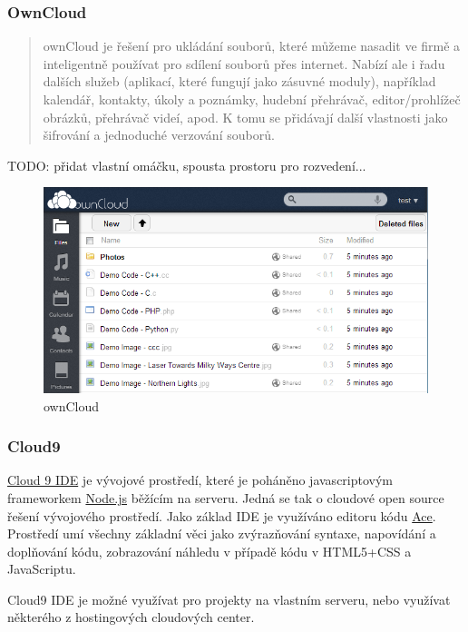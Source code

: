 \subsubsection{OwnCloud}
\begin{quote}ownCloud je řešení pro ukládání souborů, které můžeme nasadit ve firmě a inteligentně používat pro sdílení souborů přes internet. Nabízí ale i řadu dalších služeb (aplikací, které fungují jako zásuvné moduly), například kalendář, kontakty, úkoly a poznámky, hudební přehrávač, editor/prohlížeč obrázků, přehrávač videí, apod. K tomu se přidávají další vlastnosti jako šifrování a jednoduché verzování souborů.\cite{samuraj:ownCLoud5}
\end{quote}
TODO: přidat vlastní omáčku, spousta prostoru pro rozvedení...
\begin{figure}[htbp]
	\centering
		\includegraphics[width=1.00\textwidth]{ext/ownCloud.png}
	\caption{ownCloud}
	\label{fig:ownCloud}
\end{figure}

\subsubsection{Cloud9}
\href{https://github.com/ajaxorg/cloud9}{Cloud 9 IDE} je vývojové prostředí, které je poháněno javascriptovým frameworkem \href{http://nodejs.org/}{Node.js} běžícím na serveru. Jedná se tak o cloudové open source řešení vývojového prostředí. Jako základ IDE je využíváno editoru kódu \href{http://ace.c9.io/}{Ace}. Prostředí umí všechny základní věci jako zvýrazňování syntaxe, napovídání a doplňování kódu, zobrazování náhledu v případě kódu v HTML5+CSS a JavaScriptu.

Cloud9 IDE je možné využívat pro projekty na vlastním serveru, nebo využívat některého z hostingových cloudových center.

